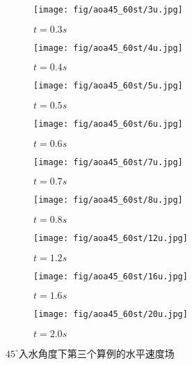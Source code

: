\begin{figure}[!htp]
  \centering

  \begin{subfigure}{0.25\textwidth}
    \centering
    \texttt{[image: fig/aoa45\_60st/3u.jpg]}
    \caption{$t = 0.3s$}
  \end{subfigure}
  \hspace{1cm}
  \begin{subfigure}{0.25\textwidth}
    \centering
    \texttt{[image: fig/aoa45\_60st/4u.jpg]}
    \caption{$t = 0.4s$}
  \end{subfigure}
  \hspace{1cm}
  \begin{subfigure}{0.25\textwidth}
    \centering
    \texttt{[image: fig/aoa45\_60st/5u.jpg]}
    \caption{$t = 0.5s$}
  \end{subfigure}

  \quad

  \begin{subfigure}{0.25\textwidth}
    \centering
    \texttt{[image: fig/aoa45\_60st/6u.jpg]}
    \caption{$t = 0.6s$}
  \end{subfigure}
  \hspace{1cm}
  \begin{subfigure}{0.25\textwidth}
    \centering
    \texttt{[image: fig/aoa45\_60st/7u.jpg]}
    \caption{$t = 0.7s$}
  \end{subfigure}
  \hspace{1cm}
  \begin{subfigure}{0.25\textwidth}
    \centering
    \texttt{[image: fig/aoa45\_60st/8u.jpg]}
    \caption{$t = 0.8s$}
  \end{subfigure}

  \quad 

  \begin{subfigure}{0.25\textwidth}
    \centering
    \texttt{[image: fig/aoa45\_60st/12u.jpg]}
    \caption{$t = 1.2s$}
  \end{subfigure}
  \hspace{1cm}
  \begin{subfigure}{0.25\textwidth}
    \centering
    \texttt{[image: fig/aoa45\_60st/16u.jpg]}
    \caption{$t = 1.6s$}
  \end{subfigure}
  \hspace{1cm}
  \begin{subfigure}{0.25\textwidth}
    \centering
    \texttt{[image: fig/aoa45\_60st/20u.jpg]}
    \caption{$t = 2.0s$}
  \end{subfigure}

  \caption{$45^\circ$入水角度下第三个算例的水平速度场}
  \label{fig:detail_45_u}
\end{figure}
